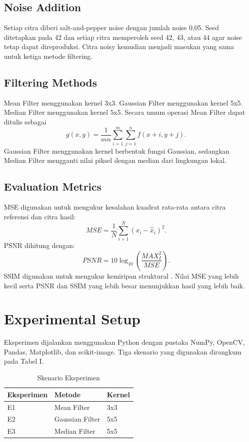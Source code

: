 \documentclass[conference,a4paper]{IEEEtran}
\begin{document}
\subsection{Noise Addition}
Setiap citra diberi salt-and-pepper noise dengan jumlah noise 0,05. Seed ditetapkan pada 42 dan setiap citra memperoleh seed 42, 43, atau 44 agar noise tetap dapat direproduksi. Citra noisy kemudian menjadi masukan yang sama untuk ketiga metode filtering.

\subsection{Filtering Methods}
Mean Filter menggunakan kernel 3x3. Gaussian Filter menggunakan kernel 5x5. Median Filter menggunakan kernel 5x5. Secara umum operasi Mean Filter dapat ditulis sebagai
\begin{equation}
g(x,y)=\frac{1}{mn}\sum_{i=1}^{m}\sum_{j=1}^{n} f(x+i,y+j).
\end{equation}
Gaussian Filter menggunakan kernel berbentuk fungsi Gaussian, sedangkan Median Filter mengganti nilai piksel dengan median dari lingkungan lokal.

\subsection{Evaluation Metrics}
MSE digunakan untuk mengukur kesalahan kuadrat rata-rata antara citra referensi dan citra hasil:
\begin{equation}
MSE=\frac{1}{N}\sum_{i=1}^{N}(x_i-\hat{x}_i)^2.
\end{equation}
PSNR dihitung dengan:
\begin{equation}
PSNR=10\log_{10}\left(\frac{MAX_I^2}{MSE}\right).
\end{equation}
SSIM digunakan untuk mengukur kemiripan struktural \cite{wang2004}. Nilai MSE yang lebih kecil serta PSNR dan SSIM yang lebih besar menunjukkan hasil yang lebih baik.

\section{Experimental Setup}
Eksperimen dijalankan menggunakan Python dengan pustaka NumPy, OpenCV, Pandas, Matplotlib, dan scikit-image. Tiga skenario yang digunakan dirangkum pada Tabel I.

\begin{table}[t]
\caption{Skenario Eksperimen}
\centering
\begin{tabular}{lll}
\toprule
Eksperimen & Metode & Kernel \\
\midrule
E1 & Mean Filter & 3x3 \\
E2 & Gaussian Filter & 5x5 \\
E3 & Median Filter & 5x5 \\
\bottomrule
\end{tabular}
\end{table}
\end{document}
